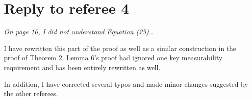 \documentclass[12pt]{article}
\begin{document}
\section*{\hfill Reply to referee 4\hfill}

\emph{On page 10, I did not understand Equation (25)\dots}

\strut

\noindent I have rewritten this part of the proof as well as a similar
construction in the proof of Theorem 2. Lemma 6's proof had ignored
one key measurability requirement and has been entirely rewritten as
well.

In addition, I have corrected several typos and made minor changes
suggested by the other referees.
\end{document}
